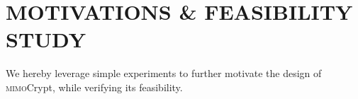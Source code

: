 \documentclass[conference,compsoc]{IEEEtran}
\newcommand{\name}{\textsc{mimo}Crypt\xspace}
\newcommand{\sname}{\textsc{mimo}Crypt\xspace}
\newcommand{\needrev}[1]{{\color{green}#1}} %
\newcommand{\needrev}[1]{#1}
\begin{document}
{%
%
%
}


%
\section{\MakeUppercase{Motivations \& Feasibility Study}} \label{sec:motiv}
\vspace{-.5ex}
%
We hereby leverage simple experiments to further motivate the design of \sname, while verifying its feasibility.
\end{document}
